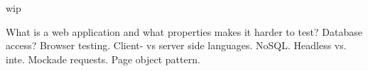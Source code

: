 \label{sec:testing_web}

wip

What is a web application and what properties makes it harder to test?
Database access? Browser testing. Client- vs server side languages.
NoSQL. Headless vs. inte. Mockade requests. Page object pattern.

